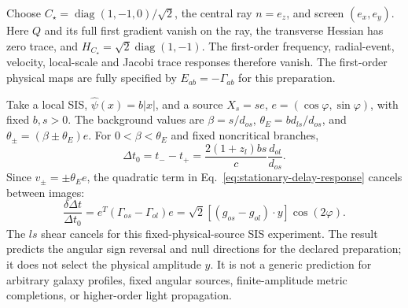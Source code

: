 Choose $C_\star=\operatorname{diag}(1,-1,0)/\sqrt2$, the central ray
$n=e_z$, and screen $(e_x,e_y)$.
Here $Q$ and its full first gradient vanish on the ray, the transverse
Hessian has zero trace, and
$H_{C_\star}=\sqrt2\operatorname{diag}(1,-1)$.
The first-order frequency, radial-event, velocity, local-scale and Jacobi
trace responses therefore vanish.  The first-order physical maps are
fully specified by $E_{ab}=-\Gamma_{ab}$ for this preparation.

Take a local SIS, $\widehat\psi(x)=b|x|$, and a source
$X_s=s e$, $e=(\cos\varphi,\sin\varphi)$, with fixed $b,s>0$.
The background values are $\beta=s/d_{os}$,
$\theta_E=bd_{ls}/d_{os}$, and
$\theta_\pm=(\beta\pm\theta_E)e$.
For $0<\beta<\theta_E$ and fixed noncritical branches,
\begin{equation}
 \Delta t_0=t_- -t_+
 =\frac{2(1+z_l)bs}{c}\frac{d_{ol}}{d_{os}}.
 \label{eq:sis-background-delay}
\end{equation}
Since $v_\pm=\pm\theta_E e$, the quadratic term in
Eq.~\eqref{eq:stationary-delay-response} cancels between images:
\begin{equation}
 \boxed{\frac{\delta\Delta t}{\Delta t_0}
 =e^T(\Gamma_{os}-\Gamma_{ol})e
 =\sqrt2[(g_{os}-g_{ol})\cdot y]\cos(2\varphi).}
 \label{eq:quadrupole-delay-law}
\end{equation}
The $ls$ shear cancels for this fixed-physical-source SIS experiment.
The result predicts the angular sign reversal and null directions for
the declared preparation; it does not select the physical amplitude $y$.
It is not a generic prediction for arbitrary galaxy profiles, fixed
angular sources, finite-amplitude metric completions, or higher-order
light propagation.
